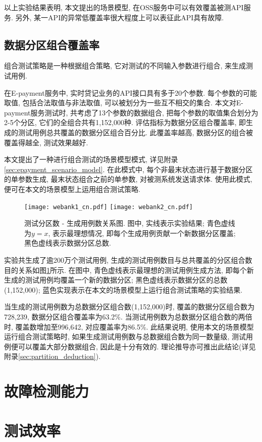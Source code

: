             以上实验结果表明, 本文提出的场景模型, 在OSS服务中可以有效覆盖被测API服务. 另外, 某一API的异常低覆盖率很大程度上可以表征此API具有故障.
        
        \subsection{数据分区组合覆盖率}
        
            \label{sec:partition}
            
            组合测试策略\cite{grindal2005combination}是一种根据组合策略, 它对测试的不同输入参数进行组合, 来生成测试用例.
            
            在E-payment服务中, 实时贷记业务的API接口具有多于20个参数. 每个参数的可能取值, 包括合法取值与非法取值, 可以被划分为一些互不相交的集合. 本文对E-payment服务测试时, 共考虑了13个参数的数据组合, 把每个参数的取值集合划分为2-5个分区,  它们的全组合共有1,152,000种. 评估指标为数据分区组合覆盖率, 即生成的测试用例总共覆盖的数据分区组合百分比. 此覆盖率越高, 数据分区的组合被覆盖得越全, 测试效果越好. 
            
            本文提出了一种进行组合测试的场景模型模式, 详见附录\ref{sec:epayment_scenario_model}. 在此模式中, 每个非最末状态进行基于数据分区的单参数生成, 最末状态组合之前的单参数, 对被测系统发送请求体. 使用此模式, 便可在本文的场景模型上运用组合测试策略.
            
            \begin{figure}[!hbp]
                \centering
                \texttt{[image: webank1\_cn.pdf]}
                \texttt{[image: webank2\_cn.pdf]}
                \caption{测试分区数 - 生成用例数关系图. 图中, 实线表示实验结果; 青色虚线为$y=x$, 表示最理想情况, 即每个生成用例贡献一个新数据分区覆盖; 黑色虚线表示数据分区总数.}
                \label{fig:partition}
            \end{figure}
            
            实验共生成了逾200万个测试用例, 生成的测试用例数目与总共覆盖的分区组合数目的关系如图\ref{fig:partition}所示. 在图中, 青色虚线表示最理想的测试用例生成方法, 即每个新生成的测试用例均覆盖一个新的数据分区; 黑色虚线表示数据分区的总数(1,152,000); 蓝色实现表示在本文的场景模型上运行组合测试策略的实验结果.
            
            当生成的测试用例数为总数据分区组合数(1,152,000)时, 覆盖的数据分区组合数为728,239, 数据分区组合覆盖率为63.2\%. 当测试用例数为总数据分区组合数的两倍时, 覆盖数增加至996,642, 对应覆盖率为86.5\%. 此结果说明, 使用本文的场景模型运行组合测试策略时, 如果生成测试用例数与总数据组合数为同一数量级, 测试用例便可以覆盖大部分数据组合, 因此是十分有效的. 理论推导亦可推出此结论(详见附录\ref{sec:partition_deduction}).
    
    \section{故障检测能力}
    
    \section{测试效率}


